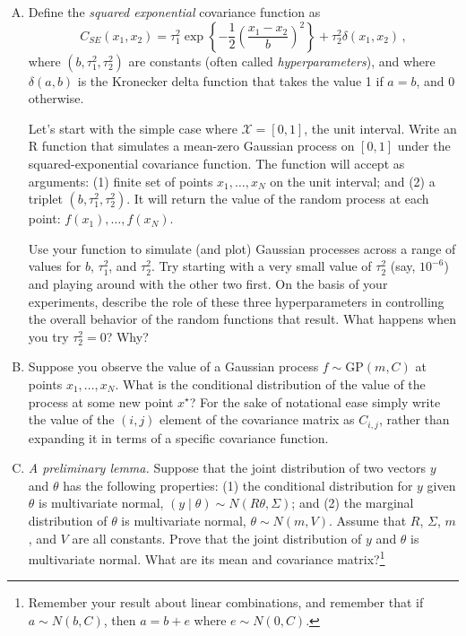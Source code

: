 \documentclass{mynotes}
\begin{document}
\begin{enumerate}[(A)]
\item   Define the \textit{squared exponential} covariance function as
$$
C_{SE}(x_1, x_2) = \tau_1^2 \exp \left\{ - \frac{1}{2} \left( \frac{x_1 - x_2}{b} \right)^2 \right\} + \tau^2_2 \delta(x_1, x_2) \, ,
$$
where $(b, \tau^2_1, \tau^2_2)$ are constants (often called \textit{hyperparameters}), and where $\delta(a,b)$ is the Kronecker delta function that takes the value 1 if $a=b$, and 0 otherwise.

Let's start with the simple case where $\mathcal{X} = [0,1]$, the unit interval.  Write an R function that simulates a mean-zero Gaussian process on $[0,1]$ under the squared-exponential covariance function.  The function will accept as arguments: (1) finite set of points $x_1, \ldots, x_N$ on the unit interval; and (2) a triplet $(b, \tau^2_1, \tau^2_2)$. It will return the value of the random process at each point: $f(x_1), \ldots, f(x_N)$.

Use your function to simulate (and plot) Gaussian processes across a range of values for $b$, $\tau^2_1$, and $\tau^2_2$.  Try starting with a very small value of $\tau^2_2$ (say, $10^{-6}$) and playing around with the other two first.  On the basis of your experiments, describe the role of these three hyperparameters in controlling the overall behavior of the random functions that result.  What happens when you try $\tau^2_2 = 0$? Why?

\item Suppose you observe the value of a Gaussian process $f \sim \mbox{GP}(m,C)$ at points $x_1, \ldots, x_N$.  What is the conditional distribution of the value of the process at some new point $x^{\star}$?  For the sake of notational ease simply write the value of the $(i,j)$ element of the covariance matrix as $C_{i,j}$, rather than expanding it in terms of a specific covariance function.

\item \textit{A preliminary lemma.}  Suppose that the joint distribution of two vectors $y$ and $\theta$ has the following properties: (1) the conditional distribution for $y$ given $\theta$ is multivariate normal, $(y \mid \theta) \sim N(R\theta, \Sigma)$; and (2) the marginal distribution of $\theta$ is multivariate normal, $\theta \sim N(m,V)$.  Assume that $R$, $\Sigma$, $m$, and $V$ are all constants.  Prove that the joint distribution of $y$ and $\theta$ is multivariate normal.  What are its mean and covariance matrix?\footnote{Remember your result about linear combinations, and remember that if $a \sim N(b,C)$, then $a = b + e$ where $e \sim N(0, C)$.}


\end{enumerate}
\end{document}

